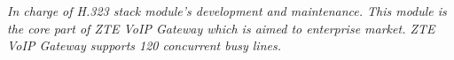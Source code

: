 \documentclass[margin]{res}
\begin{document}
\begin{resume}
\begin{itemize}
                     {\sl In charge of H.323 stack module's development and maintenance. This module
                       is the core part of ZTE VoIP Gateway which is aimed to enterprise market. ZTE
                       VoIP Gateway supports 120 concurrent busy lines. }
                   \end{itemize} 
\end{resume}
\end{document}
